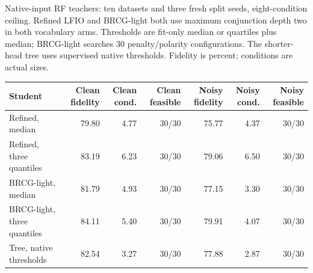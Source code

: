 \begin{kbtable}
\centering
\caption{Native-input RF teachers: ten datasets and three fresh split seeds, eight-condition ceiling. Refined LFIO and BRCG-light both use maximum conjunction depth two in both vocabulary arms. Thresholds are fit-only median or quartiles plus median; BRCG-light searches 30 penalty/polarity configurations. The shorter-head tree uses supervised native thresholds. Fidelity is percent; conditions are actual sizes.}
\label{tab:followup_native}
\small
\begin{adjustbox}{max width=\linewidth}
\begin{tabular}{lrrrrrr}
\toprule
Student & Clean fidelity & Clean cond. & Clean feasible & Noisy fidelity & Noisy cond. & Noisy feasible \\
\midrule
Refined, median & 79.80 & 4.77 & 30/30 & 75.77 & 4.37 & 30/30 \\
Refined, three quantiles & 83.19 & 6.23 & 30/30 & 79.06 & 6.50 & 30/30 \\
BRCG-light, median & 81.79 & 4.93 & 30/30 & 77.15 & 3.30 & 30/30 \\
BRCG-light, three quantiles & 84.11 & 5.40 & 30/30 & 79.91 & 4.07 & 30/30 \\
Tree, native thresholds & 82.54 & 3.27 & 30/30 & 77.88 & 2.87 & 30/30 \\
\bottomrule
\end{tabular}
\end{adjustbox}
\end{kbtable}
